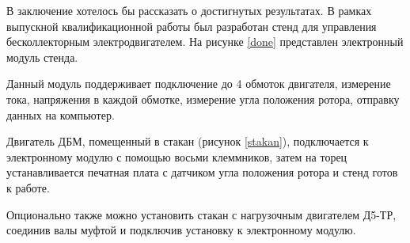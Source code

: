 \conclusion

В заключение хотелось бы рассказать о достигнутых результатах.
В рамках выпускной квалификационной работы был разработан 
стенд для управления бесколлекторным электродвигателем.
На рисунке \ref{done} представлен электронный модуль стенда.


Данный модуль поддерживает подключение до 4 обмоток двигателя, измерение тока,
напряжения в каждой обмотке, измерение угла положения ротора, отправку данных на компьютер.

Двигатель ДБМ, помещенный в стакан (рисунок \ref{stakan}), подключается к электронному
модулю с помощью восьми клеммников, затем на торец устанавливается 
печатная плата с датчиком угла положения ротора и стенд готов к работе.

Опционально также можно установить стакан с нагрузочным двигателем Д5-ТР, соединив
валы муфтой и подключив установку к электронному модулю.

